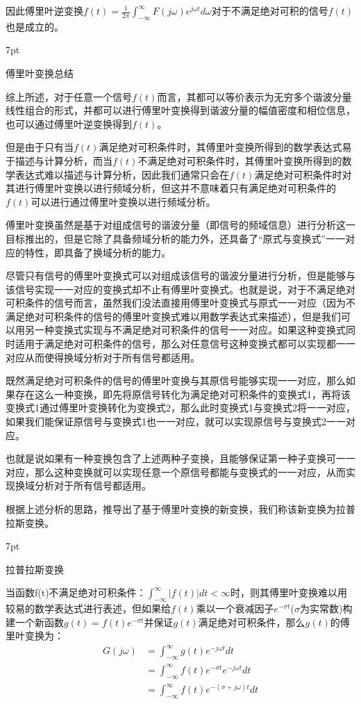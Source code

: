 \documentclass{article}
\numberwithin{equation}{section}
\numberwithin{figure}{section}
\newenvironment{formal}{%
\def\FrameCommand{%
\hspace{1pt}%
{\color{DarkBlue}\vrule width 2pt}%
{\color{formalshade}\vrule width 4pt}%
\colorbox{formalshade}%
}%
\MakeFramed{\advance\hsize-\width\FrameRestore}%
\noindent\hspace{-4.55pt}%
\begin{adjustwidth}{}{7pt}%
\vspace{2pt}\vspace{2pt}%
}
{%
\vspace{2pt}\end{adjustwidth}\endMakeFramed%
}
\begin{document}
因此傅里叶逆变换$f(t)=\frac{1}{2\pi}\int_{-\infty}^{\infty}F(j\omega)e^{j\omega t}d\omega$对于不满足绝对可积的信号$f(t)$也是成立的。

\begin{formal}
    傅里叶变换总结
\end{formal}

综上所述，对于任意一个信号$f(t)$而言，其都可以等价表示为无穷多个谐波分量线性组合的形式，并都可以进行傅里叶变换得到谐波分量的幅值密度和相位信息，也可以通过傅里叶逆变换得到$f(t)$。

但是由于只有当$f(t)$满足绝对可积条件时，其傅里叶变换所得到的数学表达式易于描述与计算分析，而当$f(t)$不满足绝对可积条件时，其傅里叶变换所得到的数学表达式难以描述与计算分析，因此我们通常只会在$f(t)$满足绝对可积条件时对其进行傅里叶变换以进行频域分析，但这并不意味着只有满足绝对可积条件的$f(t)$可以进行通过傅里叶变换以进行频域分析。

傅里叶变换虽然是基于对组成信号的谐波分量（即信号的频域信息）进行分析这一目标推出的，但是它除了具备频域分析的能力外，还具备了“原式与变换式”一一对应的特性，即具备了换域分析的能力。

尽管只有信号的傅里叶变换式可以对组成该信号的谐波分量进行分析，但是能够与该信号实现一一对应的变换式却不止有傅里叶变换式。也就是说，对于不满足绝对可积条件的信号而言，虽然我们没法直接用傅里叶变换式与原式一一对应（因为不满足绝对可积条件的信号的傅里叶变换式难以用数学表达式来描述），但是我们可以用另一种变换式实现与不满足绝对可积条件的信号一一对应。如果这种变换式同时适用于满足绝对可积条件的信号，那么对任意信号这种变换式都可以实现都一一对应从而使得换域分析对于所有信号都适用。

既然满足绝对可积条件的信号的傅里叶变换与其原信号能够实现一一对应，那么如果存在这么一种变换，即先将原信号转化为满足绝对可积条件的变换式1，再将该变换式1通过傅里叶变换转化为变换式2，那么此时变换式1与变换式2将一一对应，如果我们能保证原信号与变换式1也一一对应，就可以实现原信号与变换式2一一对应。

也就是说如果有一种变换包含了上述两种子变换，且能够保证第一种子变换可一一对应，那么这种变换就可以实现任意一个原信号都能与变换式的一一对应，从而实现换域分析对于所有信号都适用。

根据上述分析的思路，推导出了基于傅里叶变换的新变换，我们称该新变换为拉普拉斯变换。

\begin{formal}
    拉普拉斯变换
\end{formal}

当函数f(t)不满足绝对可积条件：$\int_{-\infty}^{\infty}|f(t)|dt<\infty$时，则其傅里叶变换难以用较易的数学表达式进行表述，但如果给$f(t)$乘以一个衰减因子$e^{-\sigma t}$($\sigma$为实常数)构建一个新函数$g(t)=f(t)e^{-\sigma t}$并保证$g(t)$满足绝对可积条件，那么$g(t)$的傅里叶变换为：
\begin{equation}
    \begin{split}
        G(j\omega)&=\int_{-\infty}^{\infty}g(t)e^{-j\omega t}dt\\
        &=\int_{-\infty}^{\infty}f(t)e^{-\sigma t}e^{-j\omega t}dt\\
        &=\int_{-\infty}^{\infty}f(t)e^{-(\sigma+j\omega) t}dt
    \end{split}\label{laplacetrans}
\end{equation}
\end{document}
